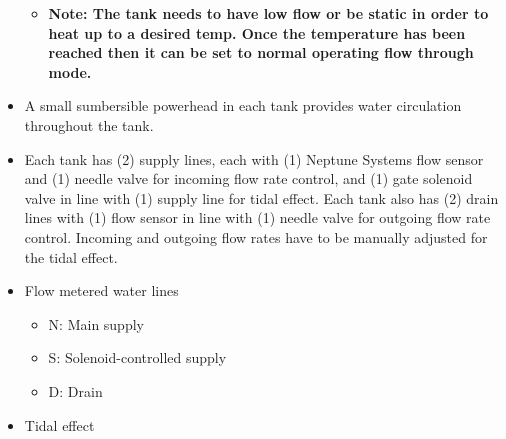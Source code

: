 \documentclass[]{book}
\providecommand{\tightlist}{%
  \setlength{\itemsep}{0pt}\setlength{\parskip}{0pt}}
\begin{document}
\begin{itemize}
  \begin{itemize}
  \tightlist
  \item
    \textbf{Note: The tank needs to have low flow or be static in order
    to heat up to a desired temp. Once the temperature has been reached
    then it can be set to normal operating flow through mode.}\\
  \end{itemize}
\item
  A small sumbersible powerhead in each tank provides water circulation
  throughout the tank.\\
\item
  Each tank has (2) supply lines, each with (1) Neptune Systems flow
  sensor and (1) needle valve for incoming flow rate control, and (1)
  gate solenoid valve in line with (1) supply line for tidal effect.
  Each tank also has (2) drain lines with (1) flow sensor in line with
  (1) needle valve for outgoing flow rate control. Incoming and outgoing
  flow rates have to be manually adjusted for the tidal effect.\\
\item
  Flow metered water lines

  \begin{itemize}
  \tightlist
  \item
    N: Main supply
  \item
    S: Solenoid-controlled supply
  \item
    D: Drain\\
  \end{itemize}
\item
  Tidal effect


\end{itemize}
\end{document}
